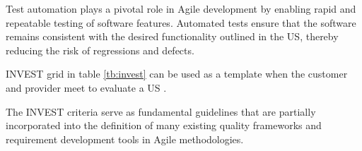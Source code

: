 Test automation plays a pivotal role in Agile development by enabling rapid and repeatable testing of software features. Automated tests ensure that the software remains consistent with the desired functionality outlined in the US, thereby reducing the risk of regressions and defects.

INVEST grid in table \ref{tb:invest} can be used as a template when the customer and provider meet to evaluate a US \cite{buglione2013improving}.

The INVEST criteria serve as fundamental guidelines that are partially incorporated into the definition of many existing quality frameworks and requirement development tools in Agile methodologies.\\ \\ 



\thispagestyle{empty}


